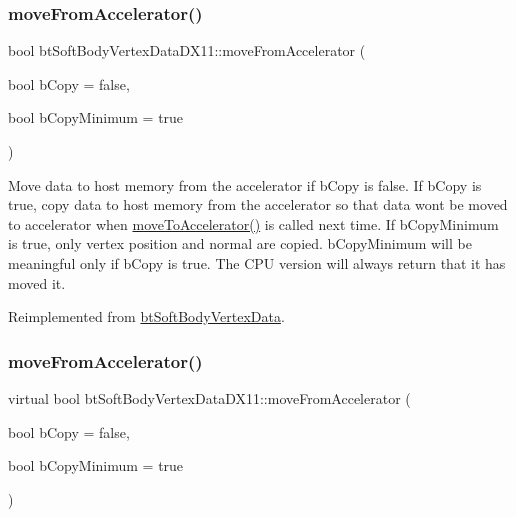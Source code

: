\subsubsection{\texorpdfstring{move\+From\+Accelerator()}{moveFromAccelerator()}\hspace{0.1cm}{\footnotesize\ttfamily [1/2]}}
{\footnotesize\ttfamily bool bt\+Soft\+Body\+Vertex\+Data\+D\+X11\+::move\+From\+Accelerator (\begin{DoxyParamCaption}\item[{bool}]{b\+Copy = {\ttfamily false},  }\item[{bool}]{b\+Copy\+Minimum = {\ttfamily true} }\end{DoxyParamCaption})\hspace{0.3cm}{\ttfamily [virtual]}}

Move data to host memory from the accelerator if b\+Copy is false. If b\+Copy is true, copy data to host memory from the accelerator so that data won\textquotesingle{}t be moved to accelerator when \hyperlink{classbtSoftBodyVertexDataDX11_ac12f0c144bc116e3a0e4c11fc0e55365}{move\+To\+Accelerator()} is called next time. If b\+Copy\+Minimum is true, only vertex position and normal are copied. b\+Copy\+Minimum will be meaningful only if b\+Copy is true. The C\+PU version will always return that it has moved it. 

Reimplemented from \hyperlink{classbtSoftBodyVertexData_aaa8ab4065ecf47a9c3b946b67b6c9f1b}{bt\+Soft\+Body\+Vertex\+Data}.

\mbox{\label{classbtSoftBodyVertexDataDX11_a16599d413d7fc7c96dfb6a335e43079e}} 
\subsubsection{\texorpdfstring{move\+From\+Accelerator()}{moveFromAccelerator()}\hspace{0.1cm}{\footnotesize\ttfamily [2/2]}}
{\footnotesize\ttfamily virtual bool bt\+Soft\+Body\+Vertex\+Data\+D\+X11\+::move\+From\+Accelerator (\begin{DoxyParamCaption}\item[{bool}]{b\+Copy = {\ttfamily false},  }\item[{bool}]{b\+Copy\+Minimum = {\ttfamily true} }\end{DoxyParamCaption})\hspace{0.3cm}{\ttfamily [virtual]}}

